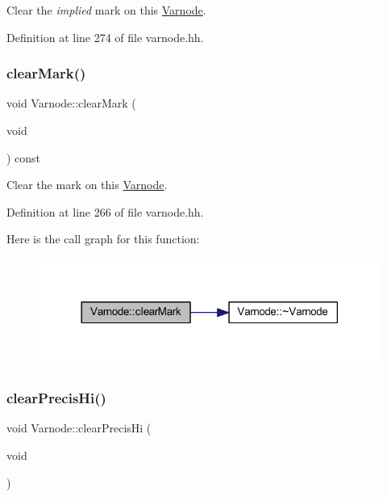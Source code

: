 Clear the {\itshape implied} mark on this \mbox{\hyperlink{class_varnode}{Varnode}}. 



Definition at line 274 of file varnode.\+hh.

\mbox{\label{class_varnode_a2a18f533dc3c9b9befdde490c75b9560}} 
\subsubsection{\texorpdfstring{clearMark()}{clearMark()}}
{\footnotesize\ttfamily void Varnode\+::clear\+Mark (\begin{DoxyParamCaption}\item[{void}]{ }\end{DoxyParamCaption}) const\hspace{0.3cm}{\ttfamily [inline]}}



Clear the mark on this \mbox{\hyperlink{class_varnode}{Varnode}}. 



Definition at line 266 of file varnode.\+hh.

Here is the call graph for this function\+:
\nopagebreak
\begin{figure}[H]
\begin{center}
\leavevmode
\includegraphics[width=318pt]{class_varnode_a2a18f533dc3c9b9befdde490c75b9560_cgraph}
\end{center}
\end{figure}
\mbox{\label{class_varnode_a08350738b4fd77d372f6aa9aeef784ce}} 
\subsubsection{\texorpdfstring{clearPrecisHi()}{clearPrecisHi()}}
{\footnotesize\ttfamily void Varnode\+::clear\+Precis\+Hi (\begin{DoxyParamCaption}\item[{void}]{ }\end{DoxyParamCaption})\hspace{0.3cm}{\ttfamily [inline]}}



